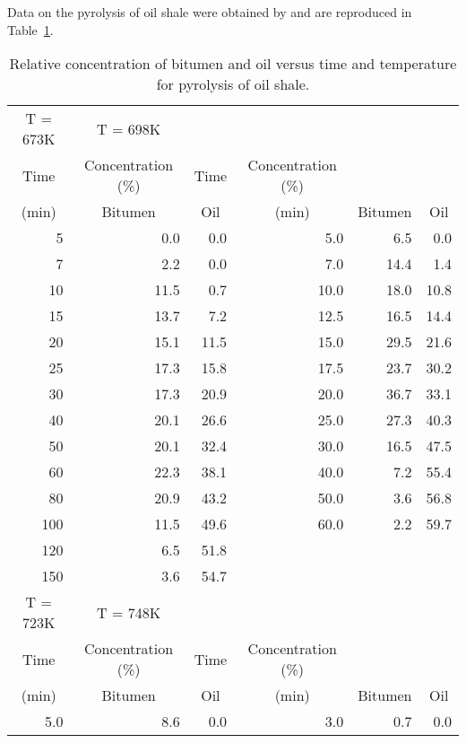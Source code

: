 Data on the pyrolysis of oil shale were obtained by
 and are reproduced in Table~\ref{atbl:oil}.
\begin{table}
  \caption{\label{atbl:oil}
  Relative concentration of bitumen and oil versus time and
  temperature for pyrolysis of oil shale.}
  \begin{center}
    \begin{tabular}{r r r r r r}
      \hline
      \multicolumn{1}{c}{T = 673K}&\multicolumn{1}{c}{T = 698K}\\
      \multicolumn{1}{c}{Time}&\multicolumn{1}{c}{Concentration (\%)}&
      \multicolumn{1}{c}{Time}&\multicolumn{1}{c}{Concentration
      (\%)}\\
      \multicolumn{1}{c}{(min)}&\multicolumn{1}{c}{Bitumen}&
      \multicolumn{1}{c}{Oil}&\multicolumn{1}{c}{(min)}&
      \multicolumn{1}{c}{Bitumen}&\multicolumn{1}{c}{Oil}\\
      \hline
      5&0.0&0.0&5.0&6.5&0.0\\
      7&2.2&0.0&7.0&14.4&1.4\\
      10&11.5&0.7&10.0&18.0&10.8\\
      15&13.7&7.2&12.5&16.5&14.4\\
      20&15.1&11.5&15.0&29.5&21.6\\
      25&17.3&15.8&17.5&23.7&30.2\\
      30&17.3&20.9&20.0&36.7&33.1\\
      40&20.1&26.6&25.0&27.3&40.3\\
      50&20.1&32.4&30.0&16.5&47.5\\
      60&22.3&38.1&40.0&7.2&55.4\\
      80&20.9&43.2&50.0&3.6&56.8\\
      100&11.5&49.6&60.0&2.2&59.7\\
      120&6.5&51.8&\\
      150&3.6&54.7&\\
      \hline
      \multicolumn{1}{c}{T = 723K}&\multicolumn{1}{c}{T = 748K}\\
      \multicolumn{1}{c}{Time}&\multicolumn{1}{c}{Concentration (\%)}&
      \multicolumn{1}{c}{Time}&\multicolumn{1}{c}{Concentration (\%)}\\
      \multicolumn{1}{c}{(min)}&\multicolumn{1}{c}{Bitumen}&
      \multicolumn{1}{c}{Oil}&\multicolumn{1}{c}{(min)}&
      \multicolumn{1}{c}{Bitumen}&\multicolumn{1}{c}{Oil}\\
      \hline
      5.0&8.6&0.0&3.0&0.7&0.0\\

\end{tabular}
\end{center}
\end{table}
